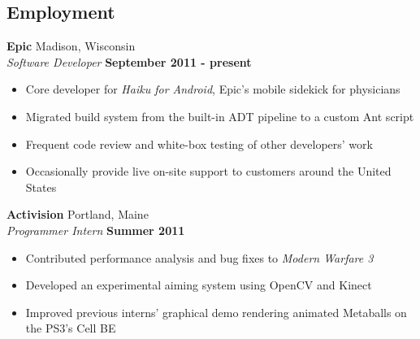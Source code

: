 \documentclass[line,margin]{res}
\begin{document}
 

\address{\url{www.luchenlabs.com}}
\address{bml4633@rit.edu}

                                  
\begin{resume}

 
\section{\sc Employment}
    \textbf{Epic} \hfill Madison, Wisconsin  \\
    \textit{Software Developer} \hfill \textbf{September 2011 - present}
    \vspace{0.05in}
    \begin{itemize}
        \item Core developer for \textit{Haiku for Android}, Epic's mobile sidekick for physicians
        \item Migrated build system from the built-in ADT pipeline to a custom Ant script
        \item Frequent code review and white-box testing of other developers' work
        \item Occasionally provide live on-site support to customers around the United States
    \end{itemize}

    \textbf{Activision} \hfill Portland, Maine  \\
    \textit{Programmer Intern} \hfill \textbf{Summer 2011}
    \vspace{0.05in}
    \begin{itemize}
        \item Contributed performance analysis and bug fixes to \textit{Modern Warfare 3}
        \item Developed an experimental aiming system using OpenCV and Kinect
        \item Improved previous interns' graphical demo rendering animated Metaballs on the PS3's Cell BE 
    \end{itemize}


\end{resume}
\end{document}
